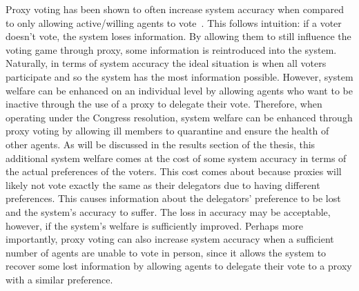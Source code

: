 Proxy voting has been shown to often increase system accuracy when compared to only
allowing active/willing agents to vote~\cite{Cohensius2017}.
This follows intuition: if a voter doesn't vote, the system loses information.
By allowing them to still influence the voting game through proxy, some information
is reintroduced into the system.
Naturally, in terms of system accuracy the ideal situation is when all voters
participate and so the system has the most information possible.
However, system welfare can be enhanced on an individual level by allowing agents
who want to be inactive through the use of a proxy to delegate their vote.
Therefore, when operating under the Congress resolution, system welfare can be
enhanced through proxy voting by allowing ill members to quarantine and ensure the
health of other agents.
As will be discussed in the results section of the thesis,
this additional system welfare comes at the cost of some system accuracy in terms of
the actual preferences of the voters.
This cost comes about because proxies will likely not vote exactly the same as their
delegators due to having different preferences.
This causes information about the delegators' preference to be lost and the system's
accuracy to suffer.
The loss in accuracy may be acceptable, however, if the system's welfare is sufficiently
improved.
Perhaps more importantly, proxy voting can also increase system accuracy when a
sufficient number of agents are unable to vote in person, since it allows the system
to recover some lost information by allowing agents to delegate their vote to a proxy
with a similar preference.


